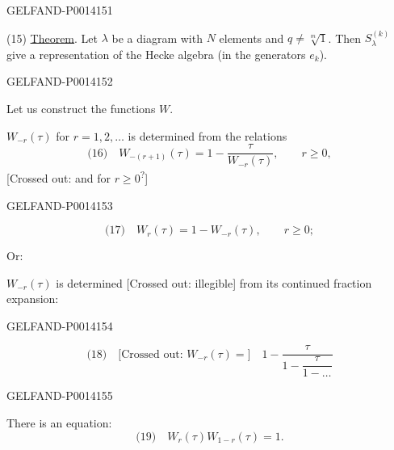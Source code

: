 \begin{GelfandAdjacentEvidence}{GELFAND-P001415}{1}

(15) \uline{Theorem}. Let \(\lambda\) be a diagram with \(N\) elements and
\(q\ne\sqrt[m]{1}\). Then \(S_{\lambda}^{(k)}\) give a representation of the Hecke algebra
(in the generators \(e_k\)).
\end{GelfandAdjacentEvidence}
\begin{GelfandAdjacentEvidence}{GELFAND-P001415}{2}


Let us construct the functions \(W\).

\(W_{-r}(\tau)\) for \(r=1,2,\ldots\) is determined from the relations
\[
\text{(16)}\quad W_{-(r+1)}(\tau)=1-\frac{\tau}{W_{-r}(\tau)},
\qquad r\geqslant0,
\]
[Crossed out: and for \(r\geqslant0\)\textsuperscript{?}]
\end{GelfandAdjacentEvidence}
\begin{GelfandAdjacentEvidence}{GELFAND-P001415}{3}

\[
\text{(17)}\quad W_r(\tau)=1-W_{-r}(\tau),\qquad r\geqslant0;
\]

Or:

\(W_{-r}(\tau)\) is determined [Crossed out: illegible] from its continued fraction expansion:
\end{GelfandAdjacentEvidence}
\begin{GelfandAdjacentEvidence}{GELFAND-P001415}{4}


\[
\text{(18)}\quad \text{[Crossed out: }W_{-r}(\tau)=\text{]}\quad
1-\frac{\tau}{1-\dfrac{\tau}{1-\ldots}}
\]
\end{GelfandAdjacentEvidence}
\begin{GelfandAdjacentEvidence}{GELFAND-P001415}{5}


There is an equation:
\[
\text{(19)}\quad W_r(\tau)W_{1-r}(\tau)=1.
\]
\end{GelfandAdjacentEvidence}
